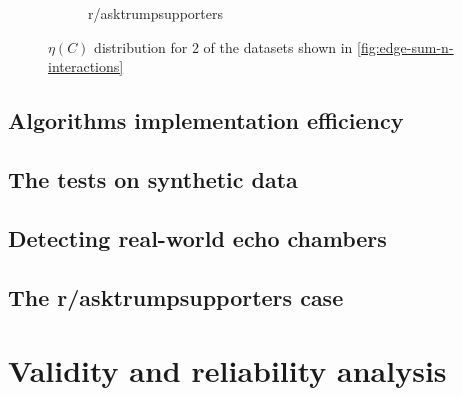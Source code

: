 \begin{figure}
\begin{center}
\begin{subfigure}[b]{0.4\textwidth}
			\caption{r/asktrumpsupporters}
			\label{fig:asktrump-hist-eta}
		\end{subfigure}
	\end{center}
	\caption{$\eta(C)$ distribution for $2$ of the datasets shown in
		\autoref{fig:edge-sum-n-interactions}}
	\label{fig:eta-distribution-content}
\end{figure}


\subsection{Algorithms implementation efficiency}%
\label{sub:algorithm_efficiency}


\subsection{The tests on synthetic data}%
\label{sub:testing_on_synthetic_data}


\subsection{Detecting real-world echo chambers}%
\label{sub:detecting_real_echo_chambers}


\subsection{The r/asktrumpsupporters case}%
\label{sub:the_r_asktrumpsupporters_case}


\section{Validity and reliability analysis}
\label{sec:reliability_analysis}


